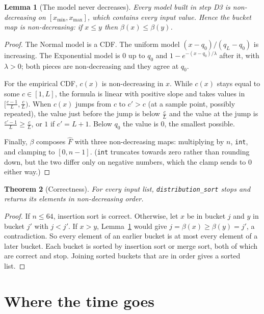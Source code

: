 \documentclass[11pt]{article}
\newtheorem{theorem}{Theorem}[section]
\newtheorem{lemma}[theorem]{Lemma}
\theoremstyle{definition}
\theoremstyle{remark}
\newcommand{\Fh}{\widehat{F}}
\newcommand{\code}[1]{\texttt{#1}}
\newcommand{\xmin}{x_{\min}}
\newcommand{\xmax}{x_{\max}}
\begin{document}
\begin{lemma}[The model never decreases]\label{lem:mono}
Every model built in step D3 is non-decreasing on $[\xmin,\xmax]$, which
contains every input value. Hence the bucket map is non-decreasing: if
$x\le y$ then $\beta(x)\le\beta(y)$.
\end{lemma}
\begin{proof}
The Normal model is a CDF. The uniform model $(x-q_0)/(q_L-q_0)$ is
increasing. The Exponential model is $0$ up to $q_0$ and
$1-e^{-(x-q_0)/\lambda}$ after it, with $\lambda>0$; both pieces are
non-decreasing and they agree at $q_0$.

For the empirical CDF, $c(x)$ is non-decreasing in $x$. While $c(x)$ stays
equal to some $c\in[1,L]$, the formula is linear with positive slope and
takes values in $[\frac{c-1}{L},\frac{c}{L})$. When $c(x)$ jumps from $c$ to
$c'>c$ (at a sample point, possibly repeated), the value just before the
jump is below $\frac cL$ and the value at the jump is $\frac{c'-1}{L}\ge\frac cL$,
or $1$ if $c'=L+1$. Below $q_0$ the value is $0$, the smallest possible.

Finally, $\beta$ composes $\Fh$ with three non-decreasing maps: multiplying
by $n$, \code{int}, and clamping to $[0,n-1]$. (\code{int} truncates towards
zero rather than rounding down, but the two differ only on negative
numbers, which the clamp sends to $0$ either way.)
\end{proof}

\begin{theorem}[Correctness]\label{thm:correct}
For every input list, \code{distribution\_sort} stops and returns its
elements in non-decreasing order.
\end{theorem}
\begin{proof}
If $n\le64$, insertion sort is correct. Otherwise, let $x$ be in bucket
$j$ and $y$ in bucket $j'$ with $j<j'$. If $x>y$, Lemma~\ref{lem:mono} would
give $j=\beta(x)\ge\beta(y)=j'$, a contradiction. So every element of an
earlier bucket is at most every element of a later bucket. Each bucket is
sorted by insertion sort or merge sort, both of which are correct and stop.
Joining sorted buckets that are in order gives a sorted list.
\end{proof}

\section{Where the time goes}
\end{document}
